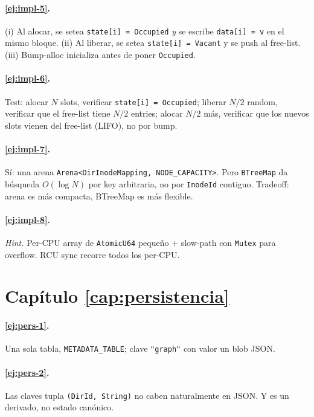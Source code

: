 \paragraph{\ref{ej:impl-5}.} (i) Al alocar, se setea
\texttt{state[i] = Occupied} \emph{y} se escribe \texttt{data[i] = v}
en el mismo bloque. (ii) Al liberar, se setea \texttt{state[i] =
Vacant} y se push al free-list. (iii) Bump-alloc inicializa antes de
poner \texttt{Occupied}.

\paragraph{\ref{ej:impl-6}.} Test: alocar $N$ slots, verificar
\texttt{state[i] = Occupied}; liberar $N/2$ random, verificar que el
free-list tiene $N/2$ entries; alocar $N/2$ más, verificar que los
nuevos slots vienen del free-list (LIFO), no por bump.

\paragraph{\ref{ej:impl-7}.} Sí: una arena
\texttt{Arena<DirInodeMapping, NODE\_CAPACITY>}. Pero \texttt{BTreeMap}
da búsqueda $O(\log N)$ por key arbitraria, no por \texttt{InodeId}
contiguo. Tradeoff: arena es más compacta, BTreeMap es más flexible.

\paragraph{\ref{ej:impl-8}.} \emph{Hint.} Per-CPU array de
\texttt{AtomicU64} pequeño + slow-path con \texttt{Mutex} para
overflow. RCU sync recorre todos los per-CPU.

\section*{Capítulo \ref{cap:persistencia}}

\paragraph{\ref{ej:pers-1}.} Una sola tabla, \texttt{METADATA\_TABLE};
clave \texttt{"graph"} con valor un blob JSON.

\paragraph{\ref{ej:pers-2}.} Las claves tupla \texttt{(DirId, String)}
no caben naturalmente en JSON. Y es un derivado, no estado canónico.

